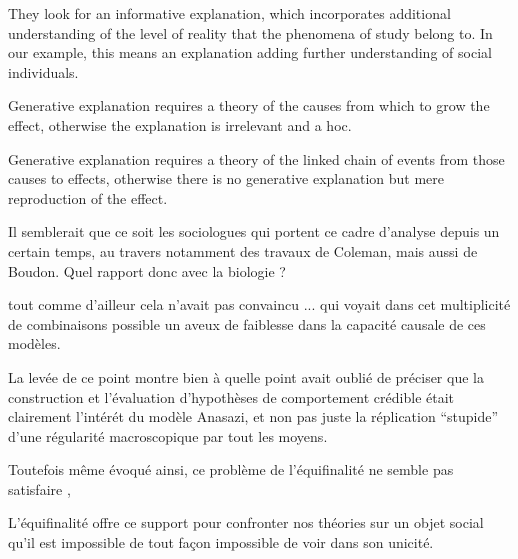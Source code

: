 They look for an informative explanation, which incorporates additional understanding of the level of reality that the phenomena of study belong to. In our example, this means an explanation adding further understanding of social individuals.

Generative explanation requires a theory of the causes from which to grow the effect, otherwise the explanation is irrelevant and a hoc.

Generative explanation requires a theory of the linked chain of events from those causes to effects, otherwise there is no
generative explanation but mere reproduction of the effect.

Il semblerait que ce soit les sociologues qui portent ce cadre d'analyse depuis un certain temps, au travers notamment des travaux de Coleman, mais aussi de Boudon. Quel rapport donc avec la biologie ? 




 

tout comme d'ailleur cela n'avait pas convaincu ...  qui voyait dans cet multiplicité de combinaisons possible un aveux de faiblesse dans la capacité causale de ces modèles. 



La levée de ce point montre bien à quelle point  \textcite{Yanoff2008} avait oublié de préciser que la construction et l'évaluation d'hypothèses de comportement crédible était clairement l'intérét du modèle Anasazi, et non pas juste la réplication \enquote{stupide} d'une régularité macroscopique par tout les moyens. 

Toutefois même évoqué ainsi, ce problème de l'équifinalité ne semble pas satisfaire \textcite{Conte2007}, 







L'équifinalité offre ce support pour confronter nos théories sur un objet social qu'il est impossible de tout façon impossible de voir dans son unicité.


